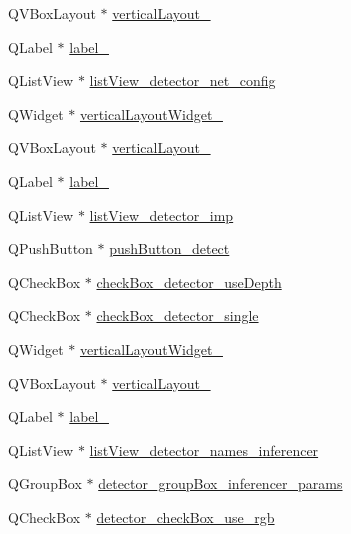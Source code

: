 \begin{DoxyCompactItemize}
\item 
Q\+V\+Box\+Layout $\ast$ \hyperlink{class_ui___main_window_a9e0b3adf005fbcdb0364e0bba347fef8}{vertical\+Layout\+\_}
\item 
Q\+Label $\ast$ \hyperlink{class_ui___main_window_a29b781f23566d0f91b217459c06929ba}{label\+\_}
\item 
Q\+List\+View $\ast$ \hyperlink{class_ui___main_window_a9f66cf27e908f8e612aa56fa4675a7ec}{list\+View\+\_\+detector\+\_\+net\+\_\+config}
\item 
Q\+Widget $\ast$ \hyperlink{class_ui___main_window_a6431c308ebd48ada348d64be00ae62a8}{vertical\+Layout\+Widget\+\_}
\item 
Q\+V\+Box\+Layout $\ast$ \hyperlink{class_ui___main_window_a45cf7ed92fd30c3af56918cb4ff88893}{vertical\+Layout\+\_}
\item 
Q\+Label $\ast$ \hyperlink{class_ui___main_window_acf6fc9bce4db154fecbd1ff532918353}{label\+\_}
\item 
Q\+List\+View $\ast$ \hyperlink{class_ui___main_window_a106145652ea658a98bb399e750817ff7}{list\+View\+\_\+detector\+\_\+imp}
\item 
Q\+Push\+Button $\ast$ \hyperlink{class_ui___main_window_a2d0cb8da286d7413988919991e390ec7}{push\+Button\+\_\+detect}
\item 
Q\+Check\+Box $\ast$ \hyperlink{class_ui___main_window_a363a4822901143cd71223c9f970c03aa}{check\+Box\+\_\+detector\+\_\+use\+Depth}
\item 
Q\+Check\+Box $\ast$ \hyperlink{class_ui___main_window_ae1ecf4d16c59c73c3d1de9e6ce7329f9}{check\+Box\+\_\+detector\+\_\+single}
\item 
Q\+Widget $\ast$ \hyperlink{class_ui___main_window_a0e7085767fe82e78059240b778140165}{vertical\+Layout\+Widget\+\_}
\item 
Q\+V\+Box\+Layout $\ast$ \hyperlink{class_ui___main_window_a078f928b999dd0b6e4a697e8c3f71985}{vertical\+Layout\+\_}
\item 
Q\+Label $\ast$ \hyperlink{class_ui___main_window_a1bf8f5e6531b7bc79378d58ee57ba389}{label\+\_}
\item 
Q\+List\+View $\ast$ \hyperlink{class_ui___main_window_ab061bde350e7c841d4280895bdadc270}{list\+View\+\_\+detector\+\_\+names\+\_\+inferencer}
\item 
Q\+Group\+Box $\ast$ \hyperlink{class_ui___main_window_ac7cec695f856e64d96f8b042943577ff}{detector\+\_\+group\+Box\+\_\+inferencer\+\_\+params}
\item 
Q\+Check\+Box $\ast$ \hyperlink{class_ui___main_window_af45df7817fc5d3df573c7d7bca295c8d}{detector\+\_\+check\+Box\+\_\+use\+\_\+rgb}

\end{DoxyCompactItemize}
